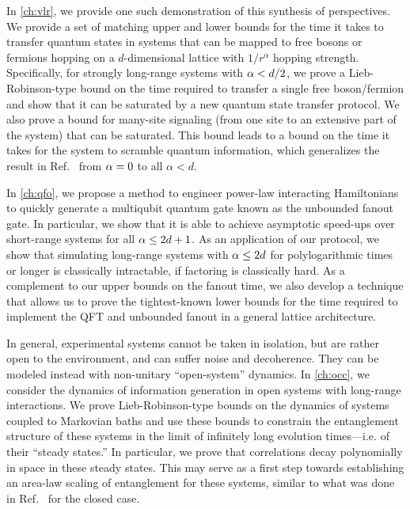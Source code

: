 In \cref{ch:vlr}, we provide one such demonstration of this synthesis of perspectives. We provide a set of matching upper and lower bounds for the time it takes to transfer quantum states in systems that can be mapped to free bosons or fermions hopping on a $d$-dimensional lattice with $1/r^{\alpha}$ hopping strength. Specifically, for strongly long-range systems with $\alpha < d/2$, we prove a Lieb-Robinson-type bound on the time required to transfer a single free boson/fermion and show that it can be saturated by a new quantum state transfer protocol. We also prove a bound for many-site signaling (from one site to an extensive part of the system) that can be saturated. This bound leads to a bound on the time it takes for the system to scramble quantum information, which generalizes the result in Ref.~\cite{Lashkari2013} from $\alpha = 0$ to all $\alpha<d$.

In \cref{ch:qfo}, we propose a method to engineer power-law interacting Hamiltonians to quickly generate a multiqubit quantum gate known as the unbounded fanout gate. In particular, we show that it is able to achieve asymptotic speed-ups over short-range systems for all $\alpha \le 2d+1$. As an application of our protocol, we show that simulating long-range systems with $\alpha \le 2d$ for polylogarithmic times or longer is classically intractable, if factoring is classically hard. As a complement to our upper bounds on the fanout time, we also develop a technique that allows us to prove the tightest-known lower bounds for the time required to implement the QFT and unbounded fanout in a general lattice architecture.

In general, experimental systems cannot be taken in isolation, but are rather open to the environment, and can suffer noise and decoherence.
They can be modeled instead with non-unitary ``open-system'' dynamics.
In \cref{ch:occ}, we consider the dynamics of information generation in open systems with long-range interactions. We prove Lieb-Robinson-type bounds on the dynamics of systems coupled to Markovian baths and use these bounds to constrain the entanglement structure of these systems in the limit of infinitely long evolution times---i.e. of their ``steady states.'' In particular, we prove that correlations decay polynomially in space in these steady states. This may serve as a first step towards establishing an area-law scaling of entanglement for these systems, similar to what was done in Ref.~\cite{Gong2017} for the closed case. %

